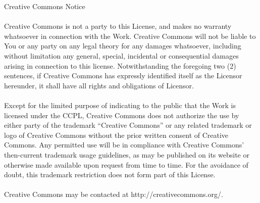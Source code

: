     Creative Commons Notice
\\ \\
    Creative Commons is not a party to this License, and makes no warranty
    whatsoever in connection with the Work. Creative Commons will not be liable
    to You or any party on any legal theory for any damages whatsoever,
    including without limitation any general, special, incidental or
    consequential damages arising in connection to this license. Notwithstanding
    the foregoing two (2) sentences, if Creative Commons has expressly
    identified itself as the Licensor hereunder, it shall have all rights and
    obligations of Licensor.
\\ \\
    Except for the limited purpose of indicating to the public that the Work is
    licensed under the CCPL, Creative Commons does not authorize the use by
    either party of the trademark ``Creative Commons'' or any related trademark or
    logo of Creative Commons without the prior written consent of Creative
    Commons. Any permitted use will be in compliance with Creative Commons'
    then-current trademark usage guidelines, as may be published on its website
    or otherwise made available upon request from time to time. For the
    avoidance of doubt, this trademark restriction does not form part of this
    License.
\\ \\
    Creative Commons may be contacted at http://creativecommons.org/.

